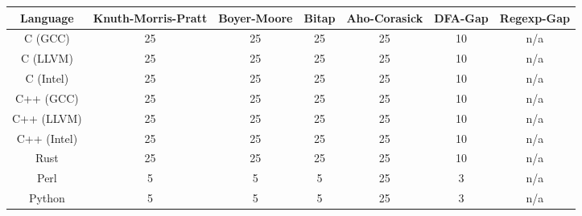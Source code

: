 \begin{tabular}{|c|c|c|c|c|c|c|}
\hline
Language&Knuth-Morris-Pratt&Boyer-Moore&Bitap&Aho-Corasick&DFA-Gap&Regexp-Gap \\
\hline
C (GCC)&25&25&25&25&10&n/a \\
C (LLVM)&25&25&25&25&10&n/a \\
C (Intel)&25&25&25&25&10&n/a \\
C++ (GCC)&25&25&25&25&10&n/a \\
C++ (LLVM)&25&25&25&25&10&n/a \\
C++ (Intel)&25&25&25&25&10&n/a \\
Rust&25&25&25&25&10&n/a \\
Perl&5&5&5&25&3&n/a \\
Python&5&5&5&25&3&n/a \\
\hline
\end{tabular}
